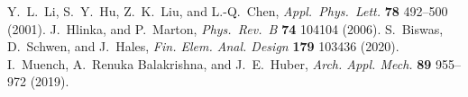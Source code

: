 \documentclass[paper=a4,14pt]{scrartcl} %
\begin{document}
%


%


\begin{thebibliography}{1}
%
Y.~L.~Li, S.~Y.~Hu, Z.~K.~Liu, and L.-Q.~Chen,
\newblock \emph{Appl.~Phys.~Lett.} \textbf{78} 492--500 (2001).
%
J.~Hlinka, and P.~Marton,
\newblock \emph{Phys.~Rev.~B} \textbf{74} 104104 (2006).
%
S.~Biswas, D.~Schwen, and J.~Hales,
\newblock \emph{Fin. Elem. Anal. Design} \textbf{179} 103436 (2020).
%
I.~Muench, A.~Renuka Balakrishna, and J.~E.~Huber,
\newblock \emph{Arch. Appl. Mech.} \textbf{89} 955–972 (2019).
%




\end{thebibliography}
\end{document}
